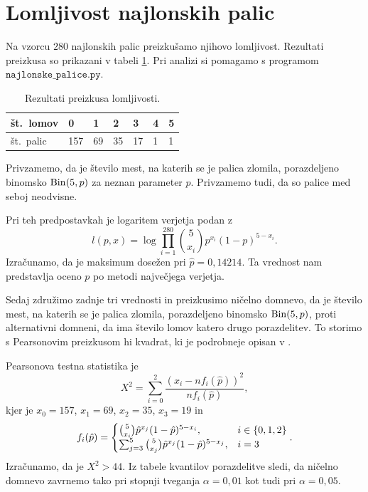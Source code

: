 \documentclass[12pt, a4paper]{article}
\begin{document}
\section{Lomljivost najlonskih palic}
Na vzorcu $280$ najlonskih palic preizkušamo njihovo lomljivost. Rezultati 
preizkusa so prikazani v tabeli \ref{table:lomljivost}. Pri analizi 
si pomagamo s programom $\texttt{najlonske\_palice.py}$.
\begin{table}[H]
    \centering
    \begin{tabular}{|l||l|l|l|l|l|l|}
        \hline
        št.~lomov & 0   & 1  & 2  & 3  & 4 & 5 \\ \hline
        št.~palic & 157 & 69 & 35 & 17 & 1 & 1 \\ \hline
    \end{tabular}
    \caption{Rezultati preizkusa lomljivosti.}
    \label{table:lomljivost}
\end{table}
Privzamemo, da je število mest, na katerih se je palica 
zlomila, porazdeljeno binomsko $\operatorname{Bin}(5, p)$ za neznan parameter $p$.
Privzamemo tudi, da so palice med seboj neodvisne.


Pri teh predpostavkah je logaritem verjetja podan z
\[
    l(p, x) = \log\prod_{i=1}^{280} \binom{5}{x_i}p^{x_i}(1-p)^{5-x_i}.
\]
Izračunamo, da je maksimum 
dosežen pri $\hat p = 0{,}14214$. Ta vrednost
nam predstavlja oceno $p$ po metodi največjega verjetja.


Sedaj združimo zadnje tri vrednosti in preizkusimo ničelno domnevo, da 
je število mest, na katerih se je palica zlomila, porazdeljeno 
binomsko $\operatorname{Bin}(5, p)$, proti alternativni domneni, da ima število 
lomov katero drugo porazdelitev.
To storimo s Pearsonovim preizkusom hi kvadrat, ki je podrobneje
opisan v \cite[poglavje~9.5]{rice2007mathematical}.

Pearsonova testna statistika je
\[
    X^2 = \sum_{i=0}^{2}\frac{(x_i - nf_i(\hat p))^2}{nf_i(\hat p)},
\]
kjer je $x_0 = 157$, $x_1 = 69$, $x_2 = 35$, $x_3 = 19$ in
\[
    f_i(\hat p) = \begin{cases}
        \binom{5}{x_i}\hat p^{x_j}(1-\hat p)^{5-x_i}, &i \in \left\{0,1,2\right\} \\
        \sum_{j=3}^{5} \binom{5}{x_j}\hat p^{x_j}(1-\hat p)^{5-x_j}, &i = 3 
    \end{cases}.
\]
Izračunamo, da je $X^2 > 44$. Iz tabele kvantilov porazdelitve 
sledi, da ničelno domnevo zavrnemo tako 
pri stopnji tveganja $\alpha = 0{,}01$ kot tudi pri $\alpha = 0{,}05$. 
\end{document}
